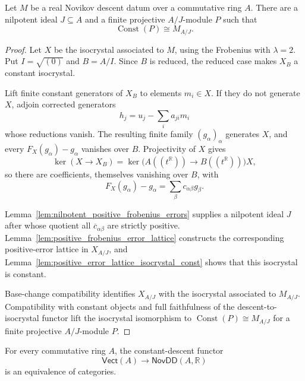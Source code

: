 \begin{lemma}
  \label{lem:novikov_descent_const_mod_nilpotent}
  \leanok
  Let $M$ be a real Novikov descent datum over a commutative ring $A$.  There
  are a nilpotent ideal $J\subseteq A$ and a finite projective $A/J$-module
  $P$ such that
  \[
    \operatorname{Const}(P)\cong M_{A/J}.
  \]
\end{lemma}

\begin{proof}
  \leanok
  Let $X$ be the isocrystal associated to $M$, using the Frobenius with
  $\lambda=2$.  Put $I=\sqrt{(0)}$ and $B=A/I$.  Since $B$ is reduced, the
  reduced case makes $X_B$ a constant isocrystal.

  Lift finite constant generators of $X_B$ to elements $m_i\in X$.  If they do
  not generate $X$, adjoin corrected generators
  \[
    h_j=u_j-\sum_i a_{ji}m_i
  \]
  whose reductions vanish.  The resulting finite family $(g_\alpha)_\alpha$
  generates $X$, and every $F_X(g_\alpha)-g_\alpha$ vanishes over $B$.
  Projectivity of $X$ gives
  \[
    \ker(X\to X_B)
      =\ker\bigl(A((t^{\mathbb{R}}))\to B((t^{\mathbb{R}}))\bigr)X,
  \]
  so there are coefficients, themselves vanishing over $B$, with
  \[
    F_X(g_\alpha)-g_\alpha
      =\sum_\beta c_{\alpha\beta}g_\beta.
  \]

  Lemma~\ref{lem:nilpotent_positive_frobenius_errors} supplies a nilpotent
  ideal $J$ after whose quotient all $\overline c_{\alpha\beta}$ are strictly
  positive.  Lemma~\ref{lem:positive_frobenius_error_lattice} constructs the
  corresponding positive-error lattice in $X_{A/J}$, and
  Lemma~\ref{lem:positive_error_lattice_isocrystal_const} shows that this
  isocrystal is constant.

  Base-change compatibility identifies $X_{A/J}$ with the isocrystal associated
  to $M_{A/J}$.  Compatibility with constant objects and full faithfulness of
  the descent-to-isocrystal functor lift the isocrystal isomorphism to
  $\operatorname{Const}(P)\cong M_{A/J}$ for a finite projective
  $A/J$-module $P$.
\end{proof}

\begin{theorem}
  \label{thm:novikov_descent_equivalence_real}
  \leanok
  For every commutative ring $A$, the constant-descent functor
  \[
    \mathsf{Vect}(A)\longrightarrow\mathsf{NovDD}(A,\mathbb{R})
  \]
  is an equivalence of categories.
\end{theorem}

